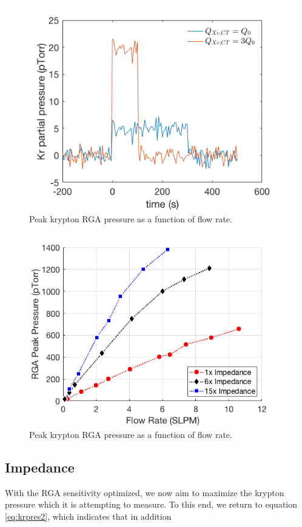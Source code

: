 \documentclass[12pt]{article}
\begin{document}
\begin{figure}[h]
  \includegraphics[width=\linewidth]{Figures/RGAtrace_ideal.png}
  \caption{Peak krypton RGA pressure as a function of flow rate.  }
  \label{fig:flowresponse1x}
\end{figure}
\begin{figure}[h]
  \includegraphics[width=\linewidth]{Figures/FlowResponse.png}
  \caption{Peak krypton RGA pressure as a function of flow rate.  }
  \label{fig:RGAtrace_ideal}
\end{figure}

\subsection{Impedance}
With the RGA sensitivity optimized, we now aim to maximize the krypton pressure which it is attempting to measure. To this end, we return to equation \ref{eq:krpres2}, which indicates that in addition 
\end{document}
